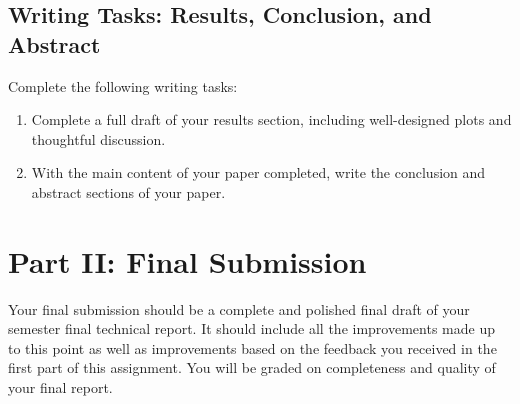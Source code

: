 \documentclass[12pt]{article}
\begin{document}
	

\subsection{Writing Tasks: Results, Conclusion, and Abstract}

Complete the following writing tasks:

\begin{enumerate}[label=\alph*.]
	\item Complete a full draft of your results section, including well-designed plots and thoughtful discussion.  
	\item With the main content of your paper completed, write the conclusion and abstract sections of your paper.
\end{enumerate}





\section{Part II: Final Submission}

Your final submission should be a complete and polished final draft of your semester final technical report.
It should include all the improvements made up to this point as well as improvements based on the feedback you received in the first part of this assignment.
You will be graded on completeness and quality of your final report.
	
	
	
\end{document}
